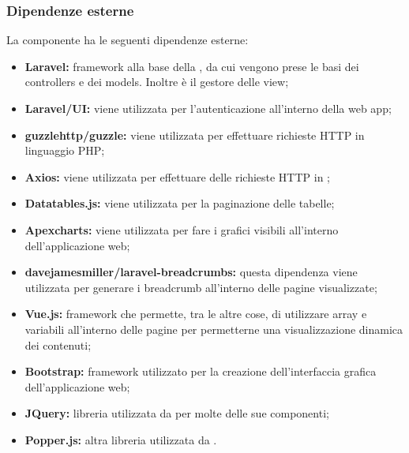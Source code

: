 	\subsubsection{Dipendenze esterne}
		La componente ha le seguenti dipendenze esterne:
		\begin{itemize}
			\item \textbf{Laravel:} framework alla base della , da cui vengono prese le basi dei controllers e dei models. Inoltre è il gestore delle view;
			\item \textbf{Laravel/UI:} viene utilizzata per l'autenticazione all'interno della web app;
			\item \textbf{guzzlehttp/guzzle:} viene utilizzata per effettuare richieste HTTP in linguaggio PHP;
			\item \textbf{Axios:} viene utilizzata per effettuare delle richieste HTTP in ;
			\item \textbf{Datatables.js:} viene utilizzata per la paginazione delle tabelle;
			\item \textbf{Apexcharts:} viene utilizzata per fare i grafici visibili all'interno dell'applicazione web;
			\item \textbf{davejamesmiller/laravel-breadcrumbs:} questa dipendenza viene utilizzata per generare i breadcrumb all'interno delle pagine visualizzate;
			\item \textbf{Vue.js:} framework che permette, tra le altre cose, di utilizzare array e variabili all'interno delle pagine per permetterne una visualizzazione dinamica dei contenuti;
			\item \textbf{Bootstrap:} framework utilizzato per la creazione dell'interfaccia grafica dell'applicazione web;
			\item \textbf{JQuery:} libreria utilizzata da  per molte delle sue componenti;
			\item \textbf{Popper.js:} altra libreria utilizzata da .
		\end{itemize}



